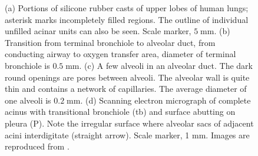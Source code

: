 \begin{figure}[H]
\begin{center}
\caption{ (a) Portions of silicone rubber casts of upper lobes
of human lungs; asterisk marks incompletely filled regions. The outline of individual unfilled acinar units can also be seen. Scale marker, $5\;\mbox{mm}$. (b) Transition from terminal bronchiole to alveolar duct, from conducting airway to oxygen transfer area, diameter of terminal bronchiole is $0.5 \;\mbox{mm}$. (c) A few alveoli in an alveolar duct. The dark round openings are pores between alveoli. The alveolar wall is quite thin and contains a network of capillaries. The average diameter of one alveoli is $0.2\;\mbox{mm}$. (d) Scanning electron micrograph of complete acinus with transitional bronchiole
(tb) and surface abutting on pleura (P). Note the irregular surface where alveolar sacs of adjacent acini interdigitate (straight arrow). Scale marker, 1 mm. Images are reproduced from \cite{lunglab}.
 }
  \end{center}
   \label{fig:acinar_units}
\end{figure}
%
\begin{table}[h]
\begin{center}
\end{center}
\caption{Shows dimensions, velocity and the corresponding Reynolds number for different sections of the airway tree during slow and rapid breathing. 
These values have been taken from \cite{pedley1970prediction}. }
\label{table:tree}
\end{table}
